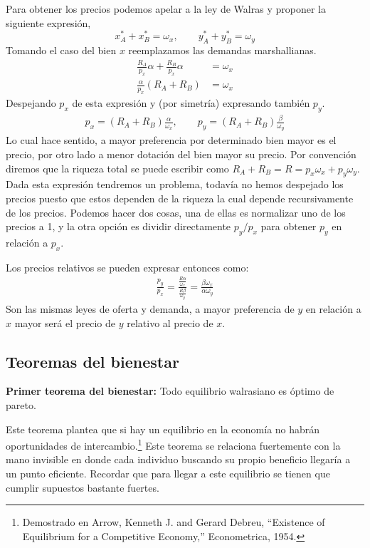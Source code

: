 Para obtener los precios podemos apelar a la ley de Walras y proponer la siguiente expresión,
\begin{equation*}
    x_A^* + x_B^* = \omega_x, \quad \quad y_A^* + y_B^* = \omega_y
\end{equation*}
Tomando el caso del bien $x$ reemplazamos las demandas marshallianas.
\begin{align*}
   \frac{R_A}{p_x} \alpha + \frac{R_B}{p_x} \alpha  &= \omega_x \\
   \frac{\alpha}{p_x} (R_A + R_B) &= \omega_x
\end{align*}
Despejando $p_x$ de esta expresión y (por simetría) expresando también $p_y$.
\begin{align*}
    p_x = (R_A + R_B)\frac{\alpha}{\omega_x}, \quad \quad p_y = (R_A + R_B)\frac{\beta}{\omega_y}
\end{align*}
Lo cual hace sentido, a mayor preferencia por determinado bien mayor es el precio, por otro lado a menor dotación del bien mayor su precio. Por convención diremos que la riqueza total se puede escribir como $R_A + R_B = R = p_x\omega_x + p_y\omega_y$. Dada esta expresión tendremos un problema, todavía no hemos despejado los precios puesto que estos dependen de la riqueza la cual depende recursivamente de los precios. Podemos hacer dos cosas, una de ellas es normalizar uno de los precios a 1, y la otra opción es dividir directamente $p_y/p_x$ para obtener $p_y$ en relación a $p_x$. 

Los precios relativos se pueden expresar entonces como:
\begin{align*}
    \frac{p_y}{p_x} = \frac{ \frac{R\alpha}{\omega_x}  }{  \frac{R\beta}{\omega_y}  } = \frac{\beta \omega_x}{\alpha \omega_y}
\end{align*}
Son las mismas leyes de oferta y demanda, a mayor preferencia de $y$ en relación a $x$ mayor será el precio de $y$ relativo al precio de $x$. 

\subsection{Teoremas del bienestar}

\textbf{Primer teorema del bienestar:} Todo equilibrio walrasiano es óptimo de pareto.

Este teorema plantea que si hay un equilibrio en la economía no habrán oportunidades de intercambio.\footnote{Demostrado en Arrow, Kenneth J. and Gerard Debreu, “Existence of Equilibrium for a Competitive Economy,” Econometrica, 1954.} Este teorema se relaciona fuertemente con la mano invisible en donde cada individuo buscando su propio beneficio llegaría a un punto eficiente. Recordar que para llegar a este equilibrio se tienen que cumplir supuestos bastante fuertes. 

